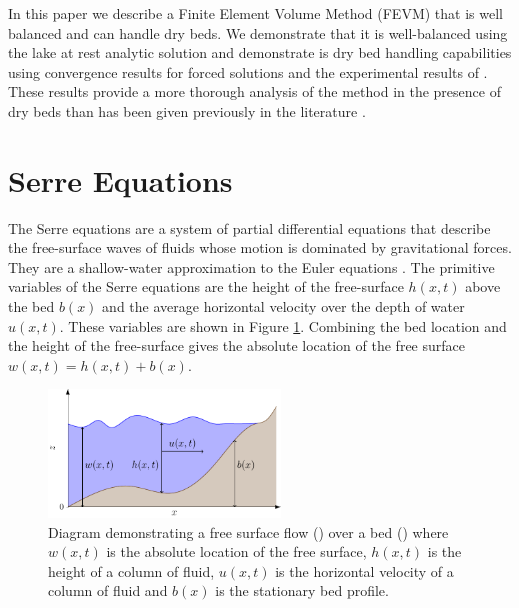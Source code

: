 \documentclass[times]{elsarticle}
\DeclareRobustCommand{\squareF}[1]{\tikz{\filldraw[#1,fill opacity= 0.3] (0,0) rectangle (0.2cm,0.2cm);}}
\begin{document}
In this paper we describe a Finite Element Volume Method (FEVM) that is well balanced and can handle dry beds. We demonstrate that it is well-balanced using the lake at rest analytic solution and demonstrate is dry bed handling capabilities using convergence results for forced solutions and the experimental results of \citet{Synolakis-1987-523}. These results provide a more thorough analysis of the method in the presence of dry beds than has been given previously in the literature \cite{Li-2014-169,Filippini-etal-2016-381}. 


\section{Serre Equations}
The Serre equations \cite{Seabra-Santos-etal-1987-117} are a system of partial differential equations that describe the free-surface waves of fluids whose motion is dominated by gravitational forces. They are a shallow-water approximation to the Euler equations \cite{Euler-1755-274}. The primitive variables of the Serre equations are the height of the free-surface $h(x,t)$ above the bed $b(x)$ and the average horizontal velocity over the depth of water $u(x,t)$. These variables are shown in Figure \ref{fig:SerreModel}. Combining the bed location and the height of the free-surface gives the absolute location of the free surface $w(x,t) = h(x,t) + b(x)$.
\begin{figure}
	\centering
	\includegraphics[width=0.55\textwidth]{./Figures/Diagrams/Watermodel/SerreModel.pdf}
	\caption{Diagram demonstrating a free surface flow (\squareF{blue}) over a bed (\squareF{brown!80!black}) where $w(x,t)$ is the absolute location of the free surface, $h(x,t)$ is the height of a column of fluid, $u(x,t)$ is the horizontal velocity of a column of fluid and $b(x)$ is the stationary bed profile.}
	\label{fig:SerreModel}
\end{figure}
\end{document}
